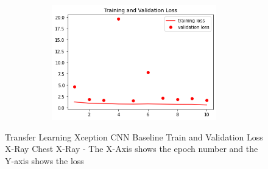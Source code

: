  \begin{figure}[H]
    \centering
    \includegraphics[width=1\textwidth,height=5cm,keepaspectratio]{Images/XceptionBaselineTrainingValidationLossChestX-Ray.png}\\
    \caption{Transfer Learning Xception CNN Baseline Train and Validation Loss X-Ray Chest X-Ray - The X-Axis shows the epoch number and the Y-axis shows the loss}
    \label{fig:Xception CNN Baseline Train and Validation Loss Chest X-Ray}
\end{figure}
